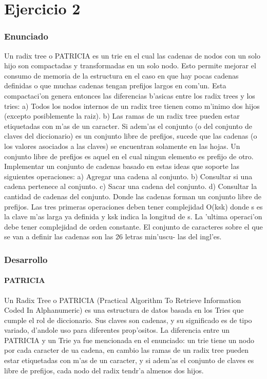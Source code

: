 \part{Ejercicio 2}
\section{Enunciado}
Un radix tree o PATRICIA es un trie en el cual las cadenas de nodos con un solo hijo
son compactadas y transformadas en un solo nodo. Esto permite mejorar el consumo de
memoria de la estructura en el caso en que hay pocas cadenas definidas o que muchas
cadenas tengan prefijos largos en com'un.
Esta compactaci'on genera entonces las diferencias b'asicas entre los radix trees y los tries:
a) Todos los nodos internos de un radix tree tienen como m'inimo dos hijos (excepto
posiblemente la raiz).
b) Las ramas de un radix tree pueden estar etiquetadas con m'as de un caracter.
Si adem'as el conjunto (o del conjunto de claves del diccionario) es un conjunto libre
de prefijos, sucede que las cadenas (o los valores asociados a las claves) se encuentran
solamente en las hojas. Un conjunto libre de prefijos es aquel en el cual ningun elemento
es prefijo de otro.
Implementar un conjunto de cadenas basado en estas ideas que soporte las siguientes
operaciones:
a) Agregar una cadena al conjunto.
b) Consultar si una cadena pertenece al conjunto.
c) Sacar una cadena del conjunto.
d) Consultar la cantidad de cadenas del conjunto.
Donde las cadenas forman un conjunto libre de prefijos. Las tres primeras operaciones
deben tener complejidad O(ksk) donde s es la clave m'as larga ya definida y ksk indica la
longitud de s. La 'ultima operaci'on debe tener complejidad de orden constante.
El conjunto de caracteres sobre el que se van a definir las cadenas son las 26 letras min'uscu-
las del ingl'es.

\section{Desarrollo}
\subsection{PATRICIA}
Un Radix Tree o PATRICIA (Practical Algorithm To Retrieve Information Coded In Alphanumeric) es una estructura de datos basada en los Tries que cumple el rol de diccionario. Sus claves son cadenas, y su significado es de tipo variado, d'andole uso para diferentes prop'ositos. La diferencia entre un PATRICIA y un Trie ya fue mencionada en el enunciado: un trie tiene un nodo por cada caracter de ua cadena, en cambio las ramas de un radix tree pueden estar etiquetadas con m'as de un caracter, y si adem'as el conjunto de claves es libre de prefijos, cada nodo del radix tendr'a almenos dos hijos.

